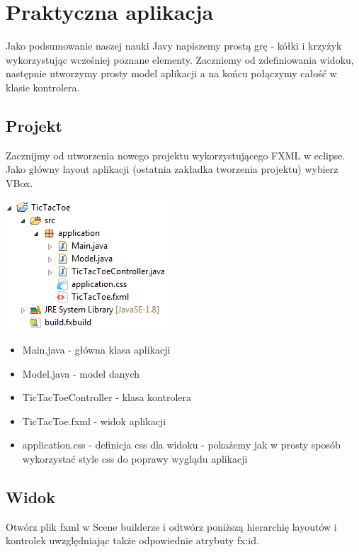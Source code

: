 \documentclass[letterpaper,10pt,english]{sphinxmanual}
\begin{document}
\section{Praktyczna aplikacja}
\label{summary:praktyczna-aplikacja}\label{summary::doc}
Jako podsumowanie naszej nauki Javy napiszemy prostą grę - kółki i krzyżyk wykorzystując wcześniej poznane elementy. Zaczniemy od zdefiniowania widoku, następnie utworzymy prosty model aplikacji a na końcu połączymy całość w klasie kontrolera.


\subsection{Projekt}
\label{summary:projekt}
Zacznijmy od utworzenia nowego projektu wykorzystującego FXML w eclipse. Jako główny layout aplikacji (ostatnia zakładka tworzenia projektu) wybierz VBox.

{\hfill\includegraphics{project.png}\hfill}
\begin{itemize}
\item {} 
Main.java - główna klasa aplikacji

\item {} 
Model.java - model danych

\item {} 
TicTacToeController - klasa kontrolera

\item {} 
TicTacToe.fxml - widok aplikacji

\item {} 
application.css - definicja css dla widoku - pokażemy jak w prosty sposób wykorzystać style css do poprawy wyglądu aplikacji

\end{itemize}


\subsection{Widok}
\label{summary:widok}
Otwórz plik fxml w Scene builderze i odtwórz poniższą hierarchię layoutów i kontrolek uwzględniając także odpowiednie atrybuty fx:id.
\end{document}
